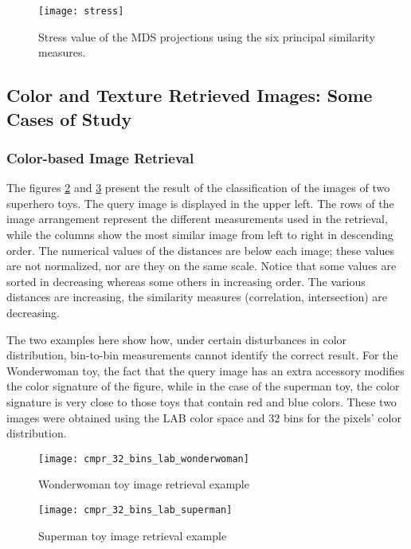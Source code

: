 \begin{figure}[!ht]
    \centering
    \texttt{[image: stress]}
 \caption{Stress value of the MDS projections using the six principal similarity measures.}
 \label{fig:stress}
\end{figure}

\subsection{Color and Texture Retrieved Images: Some Cases of Study}\label{ch:suplementary_material_retrieval_systems}

\subsubsection{Color-based Image Retrieval}\label{sec:sm_color:class}
The figures \ref{fig:wonderwoman_distances} and \ref{fig:superman_distances} present the result of the classification of the images of two superhero toys. The query image is displayed in the upper left. The rows of the image arrangement represent the different measurements used in the retrieval, while the columns show the most similar image from left to right in descending order. The numerical values of the distances are below each image; these values are not normalized, nor are they on the same scale. Notice that some values are sorted in decreasing whereas some others in increasing order. The various distances are increasing, the similarity measures (correlation, intersection) are decreasing.

The two examples here show how, under certain disturbances in color distribution, bin-to-bin measurements cannot identify the correct result. For the Wonderwoman toy, the fact that the query image has an extra accessory modifies the color signature of the figure, while in the case of the superman toy, the color signature is very close to those toys that contain red and blue colors. These two images were obtained using the LAB color space and 32 bins for the pixels' color distribution.
\begin{figure}[!ht]
 \centering    
 \texttt{[image: cmpr\_32\_bins\_lab\_wonderwoman]}
 \caption{Wonderwoman toy image retrieval example}
 \label{fig:wonderwoman_distances}
\end{figure}

\begin{figure}[!ht]
 \centering    
 \texttt{[image: cmpr\_32\_bins\_lab\_superman]}
 \caption{Superman toy image retrieval example}
 \label{fig:superman_distances}
\end{figure}


